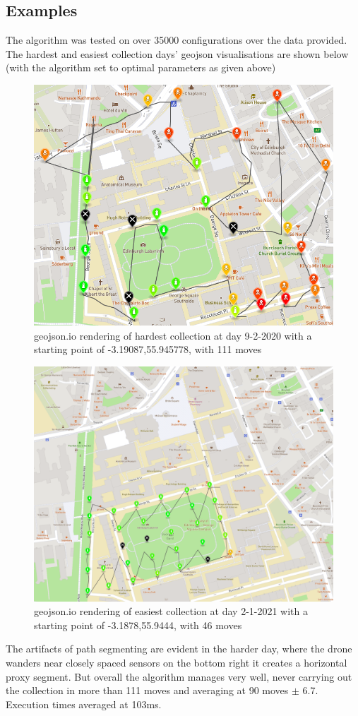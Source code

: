 \documentclass[10pt,a4paper]{article}
\begin{document}
\subsection{Examples}
The algorithm was tested on over 35000 configurations over the data provided. 
The hardest and easiest collection days' geojson visualisations are shown below (with the algorithm set to optimal parameters as given above) 
\begin{figure}[H]
    \centering
    \includegraphics[width=0.6\columnwidth]{diagrams/hard-day.png}
    \caption{geojson.io rendering of hardest collection at day 9-2-2020 with a starting point of -3.19087,55.945778, with 111 moves}
    \label{fig:hardmap}
\end{figure}
\begin{figure}[H]
    \centering
    \includegraphics[width=0.6\columnwidth]{diagrams/easy-day.png}
    \caption{geojson.io rendering of easiest collection at day 2-1-2021 with a starting point of -3.1878,55.9444, with 46 moves}
    \label{fig:easymap}
\end{figure}

The artifacts of path segmenting are evident in the harder day, where the drone wanders near closely spaced sensors on the bottom right it creates a horizontal 
proxy segment. But overall the algorithm manages very well, never carrying out the collection in more than 111 moves and averaging at 90 moves $\pm$ 6.7. Execution times averaged at 103ms.
\end{document}
